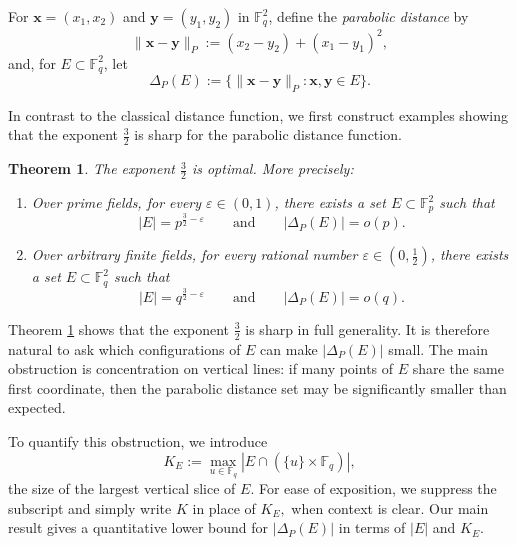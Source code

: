 \documentclass{article}
\newtheorem{theorem}{Theorem}
\newcommand{\F}{\mathbb{F}}
\newcommand{\abs}[1]{\left|#1\right|}
\newcommand{\1}{\mathbf{1}}
\begin{document}
For $\mathbf{x}=(x_1,x_2)$ and $\mathbf{y}=(y_1,y_2)$ in $\F_q^2$, define the \emph{parabolic distance} by
\begin{equation}\label{eq:def-parabolic-distance}
\|\mathbf{x}-\mathbf{y}\|_{P}:=(x_2-y_2)+(x_1-y_1)^2,
\end{equation}
and, for $E\subset \F_q^2$, let
\begin{equation*}
\Delta_P(E):=\{\|\mathbf{x}-\mathbf{y}\|_{P}: \mathbf{x}, \mathbf{y}\in E\}.
\end{equation*}


In contrast to the classical distance function, we first construct examples showing that the exponent $\frac{3}{2}$ is sharp for the parabolic distance function.

\begin{theorem}\label{thm2}
The exponent $\frac{3}{2}$ is optimal. More precisely:
\begin{enumerate}
    \item Over prime fields, for every $\varepsilon\in(0,1)$, there exists a set $E\subset \F_p^2$ such that
    \[
    |E|=p^{\frac32-\varepsilon}
    \qquad\text{and}\qquad
    |\Delta_P(E)|=o(p).
    \]
    \item Over arbitrary finite fields, for every rational number $\varepsilon\in(0,\tfrac12)$, there exists a set $E\subset \F_q^2$ such that
    \[
    |E|=q^{\frac32-\varepsilon}
    \qquad\text{and}\qquad
    |\Delta_P(E)|=o(q).
    \]
\end{enumerate}
\end{theorem}

Theorem \ref{thm2} shows that the exponent $\frac{3}{2}$ is sharp in full generality. It is therefore natural to ask which configurations of $E$ can make $|\Delta_P(E)|$ small. The main obstruction is concentration on vertical lines: if many points of $E$ share the same first coordinate, then the parabolic distance set may be significantly smaller than expected.

To quantify this obstruction, we introduce
\begin{equation}\label{eq:def-K}
K_E:=\max_{u\in \F_q}\abs{E\cap (\{u\}\times \F_q)},
\end{equation}
the size of the largest vertical slice of $E$. For ease of exposition, we suppress the subscript and simply write $K$ in place of $K_E,$ when context is clear. Our main result gives a quantitative lower bound for $\abs{\Delta_P(E)}$ in terms of $\abs{E}$ and $K_E$.
\end{document}
